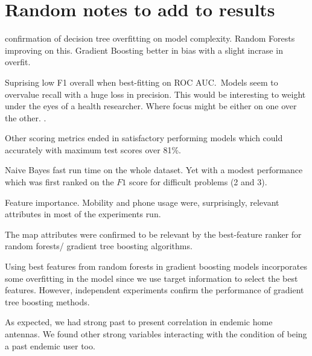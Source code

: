 \section{Random notes to add to results}

\begin{description}
    \item confirmation of decision tree overfitting on model complexity. Random Forests improving on this. Gradient Boosting better in bias with a slight incrase in overfit.
    \item Suprising low F1 overall when best-fitting on ROC AUC.\ Models seem to overvalue recall with a huge loss in precision. This would be interesting to weight under the eyes of a health researcher. Where focus might be either on one over the other. .
    \item Other scoring metrics ended in satisfactory performing models which could accurately with maximum test scores over 81\%.
    \item Naive Bayes fast run time on the whole dataset. Yet with a modest performance which was first ranked on the $F1$ score for difficult problems (2 and 3).
    \item Feature importance. Mobility and phone usage were, surprisingly, relevant attributes in most of the experiments run.
    \item The map attributes were confirmed to be relevant by the best-feature ranker for random forests/ gradient tree boosting algorithms.
    \item Using best features from random forests in gradient boosting models incorporates some overfitting in the model since we use target information to select the best features. However, independent experiments confirm the performance of gradient tree boosting methods.
    \item As expected, we had strong past to present correlation in endemic home antennas. We found other strong variables interacting with the condition of being a past endemic user too.


\end{description}


